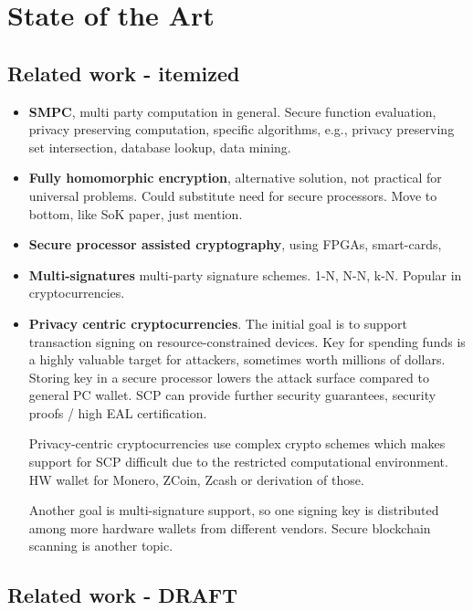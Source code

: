 \documentclass[
  digital, %
  twoside, %
  table,   %
  lof,     %
  lot,     %
]{fithesis3}
\theoremstyle{definition}
\theoremstyle{remark}
\begin{document}
\chapter{State of the Art}%
\begin{ecmmnt}  %
\section{Related work - itemized}
\begin{itemize}
    \item {\bf{SMPC}}, multi party computation in general. Secure function evaluation, privacy preserving computation, specific algorithms, e.g., privacy preserving set intersection, database lookup, data mining. 
    
    \item {\bf{Fully homomorphic encryption}}, alternative solution, not practical for universal problems. Could substitute need for secure processors. Move to bottom, like SoK paper, just mention.
    
    \item {\bf{Secure processor assisted cryptography}}, using FPGAs, smart-cards, 
    
    \item {\bf{Multi-signatures}} multi-party signature schemes. 1-N, N-N, k-N. Popular in cryptocurrencies.
    
    \item {\bf{Privacy centric cryptocurrencies}}. The initial goal is to support transaction signing on resource-constrained devices. Key for spending funds is a highly valuable target for attackers, sometimes worth millions of dollars. Storing key in a secure processor lowers the attack surface compared to general PC wallet. SCP can provide further security guarantees, security proofs / high EAL certification. 
    
    Privacy-centric cryptocurrencies use complex crypto schemes which makes support for SCP difficult due to the restricted computational environment. HW wallet for Monero, ZCoin, Zcash or derivation of those. 
    
    Another goal is multi-signature support, so one signing key is distributed among more hardware wallets from different vendors. Secure blockchain scanning is another topic. 
\end{itemize}

\section{Related work - DRAFT}

\end{ecmmnt}
\end{document}
